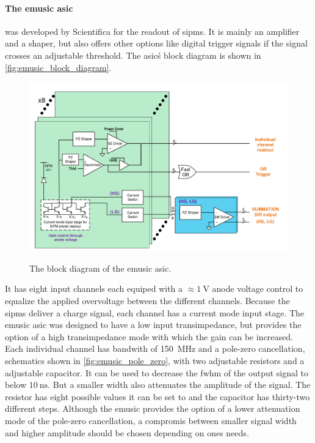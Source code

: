 \paragraph{The \ac{emusic} \ac{asic}} was developed by Scientifica for the readout of \acp{sipm}.
It is mainly an amplifier and a shaper, but also offers other options like digital trigger signals if the signal crosses an adjustable threshold.
The \ac{asic}\'s block diagram is shown in \autoref{fig:emusic_block_diagram}.
\begin{figure}
	\centering
	\includegraphics[widht=0.7\textwidht]{pictures/emusic_block_diagram.png}
	\label{fig:emusic_block_diagram}
	\caption[eMUSIC block diagram]{The block diagram of the \ac{emusic} \ac{asic}. }
\end{figure}
It has eight input channels each equiped with a $\approx\SI{1}{\volt}$ anode voltage control to equalize the applied overvoltage between the different channels.
Because the \acp{sipm} deliver a charge signal, each channel has a current mode input stage.
The \ac{emusic} \ac{asic} was designed to have a low input transimpedance, but provides the option of a high transimpedance mode with which the gain can be increased.
Each individual channel has bandwith of \SI{150}{\mega\hertz} and a pole-zero cancellation, schematics shown in \autoref{fig:emusic_pole_zero}, with two adjustable resistors and a adjustable capacitor.
It can be used to decrease the \ac{fwhm} of the output signal to below $\SI{10}{\nano\second}$.
But a smaller width also attenuates the amplitude of the signal.
The resistor has eight possible values it can be set to and the capacitor has thirty-two different steps.
Although the \ac{emusic} provides the option of a lower attenuation mode of the pole-zero cancellation, a compromis between smaller signal width and higher amplitude should be chosen depending on ones needs.
